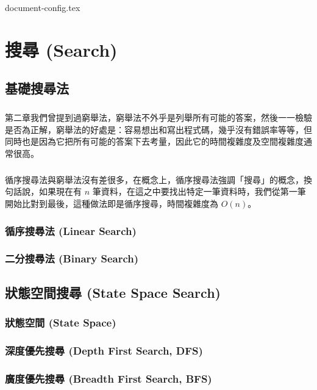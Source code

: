 \documentclass[12pt,a4paper,oneside]{report}
\begin{document}
\begin{CJK}{UTF8}{bkai}
{document-config.tex}
\setcounter{chapter}{4}

\fi

\chapter{搜尋 (Search)}

\section{基礎搜尋法}

\paragraph{}第二章我們曾提到過窮舉法，窮舉法不外乎是列舉所有可能的答案，然後一一檢驗是否為正解，窮舉法的好處是：容易想出和寫出程式碼，幾乎沒有錯誤率等等，但同時也是因為它把所有可能的答案下去考量，因此它的時間複雜度及空間複雜度通常很高。
\paragraph{}循序搜尋法與窮舉法沒有差很多，在概念上，循序搜尋法強調「搜尋」的概念，換句話說，如果現在有 $n$ 筆資料，在這之中要找出特定一筆資料時，我們從第一筆開始比對到最後，這種做法即是循序搜尋，時間複雜度為 $O(n)$。

\subsection{循序搜尋法 (Linear Search)}
\subsection{二分搜尋法 (Binary Search)}
\section{狀態空間搜尋 (State Space Search)}
\subsection{狀態空間 (State Space)}
\subsection{深度優先搜尋 (Depth First Search, DFS)}
\subsection{廣度優先搜尋 (Breadth First Search, BFS)}

\end{CJK}
\end{document}
